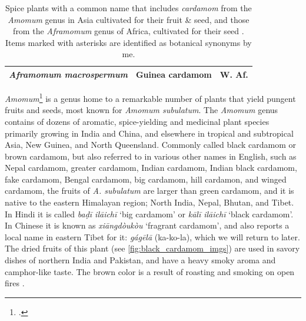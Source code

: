 \begin{table}[!ht]
\begin{tabularx}{\linewidth}{@{}lXl@{}}
\textit{Aframomum macrospermum} & Guinea cardamom & W. Af. \\
\bottomrule
\end{tabularx}
\caption[Cardamoms in the genera \textit{Amomum}, and \textit{Aframomum}.]{Spice plants with a common name that includes \textit{cardamom} from the \textit{Amomum} genus in Asia cultivated for their fruit \& seed, and those from the \textit{Aframomum} genus of Africa, cultivated for their seed \autocite{van_wyk_culinary_2014}. Items marked with asterisks are identified as botanical synonyms by me.}
\label{table:amomum_aframomum}
\end{table}

\textit{Amomum}\footcite[Amomum Roxb. ]{gbif} is a genus home to a remarkable number of plants that yield pungent fruits and seeds, most known for \textit{Amomum subulatum}. The \textit{Amomum} genus contains of dozens of aromatic, spice-yielding and medicinal plant species primarily growing in India and China, and elsewhere in tropical and subtropical Asia, New Guinea, and North Queensland. Commonly called black cardamom or brown cardamom, but also referred to in various other names in English, such as Nepal cardamom, greater cardamom, Indian cardamom, Indian black cardamom, fake cardamom, Bengal cardamom, big cardamom, hill cardamon, and winged cardamom, the fruits of \textit{A. subulatum} are larger than green cardamom, and it is native to the eastern Himalayan region; North India, Nepal, Bhutan, and Tibet. In Hindi it is called 
\textit{baḍī ilāichī} `big cardamom' or 
\textit{k\={a}lī ilāichī} `black cardamom'. In Chinese it is known as  \textit{xiāngdòukòu} `fragrant cardamom', and \textcite[327]{hu_food_2005} also reports a local name in eastern Tibet for it:  \textit{gágēlā} (ka-ko-la), which we will return to later. The dried fruits of this plant (see \cref{fig:black_cardamom_imgs}) are used in savory dishes of northern India and Pakistan, and have a heavy smoky aroma and camphor-like taste. The brown color is a result of roasting and smoking on open fires \autocite[132]{van_wyk_culinary_2014}.

